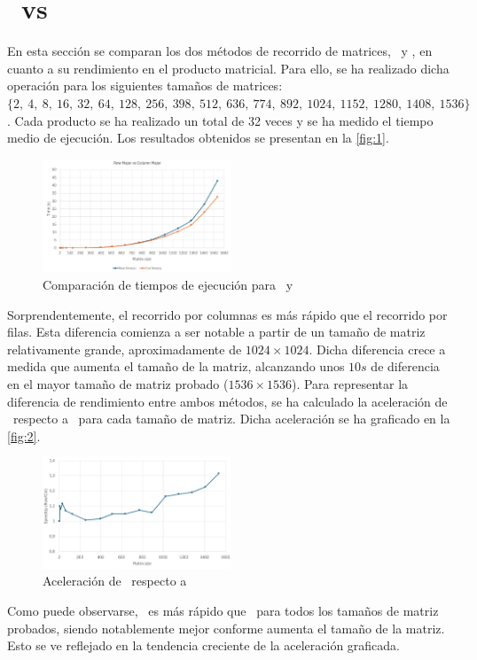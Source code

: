 \pagestyle{fancy}
\fancyhead[l]{\autorUO}
\fancyfoot[l]{\asignaturaAbbr}
\fancyfoot[r]{\fecha}

\section{\rowmajor\ vs \colmajor} \label{sec:2}
En esta sección se comparan los dos métodos de recorrido de matrices, \rowmajor\ y \colmajor, en cuanto a su rendimiento en el producto matricial.
Para ello, se ha realizado dicha operación para los siguientes tamaños de matrices: 
$\{2,\ 4,\ 8,\ 16,\ 32,\ 64,\ 128,\ 256,\ 398,\ 512,\ 636,\ 774,\ 892,\ 1024,\ 1152,\ 1280,\ 1408,\ 1536\}$. Cada producto se ha realizado un total 
de 32 veces y se ha medido el tiempo medio de ejecución. Los resultados obtenidos se presentan en la \autoref{fig:1}.

\begin{figure}[h]
    \centering
    \includegraphics[width=0.5\textwidth]{img/1.png}
    \caption{Comparación de tiempos de ejecución para \rowmajor\ y \colmajor}
    \label{fig:1}
\end{figure}

Sorprendentemente, el recorrido por columnas es más rápido que el recorrido por filas. Esta diferencia comienza a ser notable 
a partir de un tamaño de matriz relativamente grande, aproximadamente de $1024 \times 1024$.
Dicha diferencia crece a medida que aumenta el tamaño de la matriz, alcanzando unos $10s$ de diferencia en el mayor tamaño de matriz 
probado ($1536 \times 1536$).
Para representar la diferencia de rendimiento entre ambos métodos, se ha calculado la aceleración de \rowmajor\ respecto a \colmajor\ para cada tamaño de matriz.
Dicha aceleración se ha graficado en la \autoref{fig:2}.

\begin{figure}[h]
    \centering
    \includegraphics[width=0.5\textwidth]{img/2.png}
    \caption{Aceleración de \rowmajor\ respecto a \colmajor}
    \label{fig:2}
\end{figure}

Como puede observarse, \colmajor\ es más rápido que \rowmajor\ para todos los tamaños de matriz probados, siendo notablemente 
mejor conforme aumenta el tamaño de la matriz. Esto se ve reflejado en la tendencia creciente de la aceleración graficada.